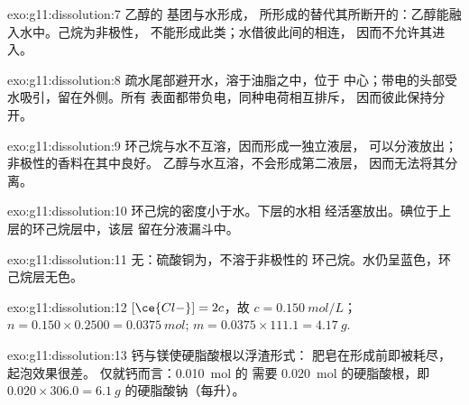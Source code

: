 \begin{solution}{exo:g11:dissolution:7}
乙醇的  基团与水形成，
所形成的替代其所断开的：乙醇能融入水中。己烷为非极性，
不能形成此类；水借彼此间的相连，
因而不允许其进入。
\end{solution}

\begin{solution}{exo:g11:dissolution:8}
疏水尾部避开水，溶于油脂之中，位于
中心；带电的头部受水吸引，留在外侧。所有
表面都带负电，同种电荷相互排斥，
因而彼此保持分开。
\end{solution}

\begin{solution}{exo:g11:dissolution:9}
环己烷与水不互溶，因而形成一独立液层，
可以分液放出；非极性的香料在其中良好。
乙醇与水互溶，不会形成第二液层，
因而无法将其分离。
\end{solution}

\begin{solution}{exo:g11:dissolution:10}
环己烷的密度小于水。下层的水相
经活塞放出。碘位于上层的环己烷层中，该层
留在分液漏斗中。
\end{solution}

\begin{solution}{exo:g11:dissolution:11}
无：硫酸铜为，不溶于非极性的
环己烷。水仍呈蓝色，环己烷层无色。
\end{solution}

\begin{solution}{exo:g11:dissolution:12}
$[\ce{Cl-}] = 2c$，故 $c = \qty{0.150}{mol/L}$；
$n = 0.150 \times 0.2500 = \qty{0.0375}{mol}$;
$m = 0.0375 \times 111.1 = \qty{4.17}{g}$.
\end{solution}

\begin{solution}{exo:g11:dissolution:13}
钙与镁使硬脂酸根以浮渣形式：
肥皂在形成前即被耗尽，起泡效果很差。
仅就钙而言：\qty{0.010}{mol} 的  需要
\qty{0.020}{mol} 的硬脂酸根，即 $0.020 \times 306.0 =
\qty{6.1}{g}$ 的硬脂酸钠（每升）。
\end{solution}

